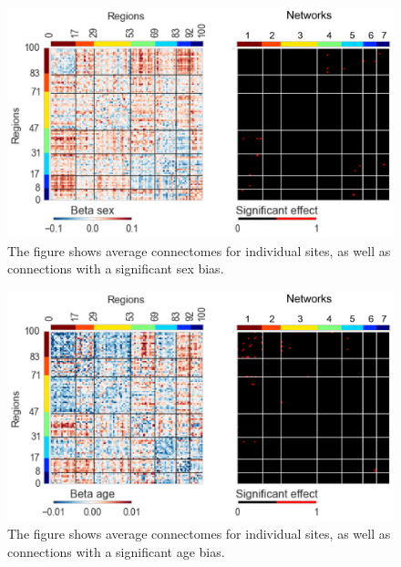 \documentclass[authoryear]{elsarticle}
\begin{document}
\begin{figure}[htbp]
\begin{center}
\includegraphics[width=\linewidth]{../figures/effect_sex.png}
\end{center}
\caption[Connectome variability across sites]{
The figure shows average connectomes for individual sites, as well as connections with a significant sex bias.
}
\label{fig_connectome_variability_sex}
\end{figure}

\begin{figure}[htbp]
\begin{center}
\includegraphics[width=\linewidth]{../figures/effect_age.png}
\end{center}
\caption[Connectome variability across sites]{
The figure shows average connectomes for individual sites, as well as connections with a significant age bias.
}
\label{fig_connectome_variability_age}
\end{figure}
\end{document}

